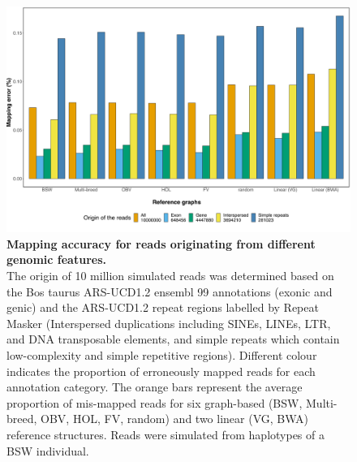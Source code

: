 \documentclass[../main.tex]{subfiles}
\begin{document}
\begin{flushleft}
\begin{figure}[!htb]
    \centering
    \includegraphics[width=\textwidth]{paper2/supplement/sp312.pdf}
    \caption[Mapping accuracy from different genomic features.]{\textbf{Mapping accuracy for reads originating from different genomic
    features.} \\
    \small{The origin of 10 million simulated reads was determined based on the Bos taurus
    ARS-UCD1.2 ensembl 99 annotations (exonic and genic) and the ARS-UCD1.2
    repeat regions labelled by Repeat Masker (Interspersed duplications including
    SINEs, LINEs, LTR, and DNA transposable elements, and simple repeats which
    contain low-complexity and simple repetitive regions). Different colour indicates the
    proportion of erroneously mapped reads for each annotation category. The orange
    bars represent the average proportion of mis-mapped reads for six graph-based
    (BSW, Multi-breed, OBV, HOL, FV, random) and two linear (VG, BWA) reference
    structures. Reads were simulated from haplotypes of a BSW individual.}}
    \label{sup_fig:s312}
\end{figure}



\end{flushleft}
\end{document}

